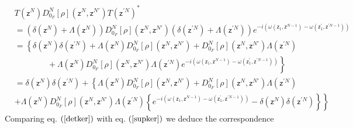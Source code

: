\documentclass[aps,preprint]{revtex4}%
\begin{document}
\begin{align}
&  T\left(  \mathsf{z}^{N}\right)  D_{0_{F}}^{N}\left[  \rho\right]  \left(
\mathsf{z}^{N},\mathsf{z}^{N\prime}\right)  T\left(  \mathsf{z}^{\prime
N}\right)  ^{\ast}\nonumber\\
&  =\left(  \delta\left(  \mathsf{z}^{N}\right)  +\Lambda\left(
\mathsf{z}^{N}\right)  \right)  D_{0_{F}}^{N}\left[  \rho\right]  \left(
\mathsf{z}^{N},\mathsf{z}^{N\prime}\right)  \left(  \delta\left(
\mathsf{z}^{\prime N}\right)  +\Lambda\left(  \mathsf{z}^{\prime N}\right)
\right)  e^{-i\left(  \omega\left(  \mathsf{z}_{1},\mathsf{z}^{N-1}\right)
-\omega\left(  \mathsf{z}_{1}^{\prime},\mathsf{z}^{\prime N-1}\right)
\right)  }\nonumber\\
&  =\left\{  \delta\left(  \mathsf{z}^{N}\right)  \delta\left(  \mathsf{z}%
^{\prime N}\right)  +\Lambda\left(  \mathsf{z}^{N}\right)  D_{0_{F}}%
^{N}\left[  \rho\right]  \left(  \mathsf{z}^{N},\mathsf{z}^{N\prime}\right)
+D_{0_{F}}^{N}\left[  \rho\right]  \left(  \mathsf{z}^{N},\mathsf{z}^{N\prime
}\right)  \Lambda\left(  \mathsf{z}^{\prime N}\right)  \right. \nonumber\\
&  \qquad\qquad+\Lambda\left(  \mathsf{z}^{N}\right)  D_{0_{F}}^{N}\left[
\rho\right]  \left(  \mathsf{z}^{N},\mathsf{z}^{N\prime}\right)
\Lambda\left(  \mathsf{z}^{\prime N}\right)  \left.  e^{-i\left(
\omega\left(  \mathsf{z}_{1},\mathsf{z}^{N-1}\right)  -\omega\left(
\mathsf{z}_{1}^{\prime},\mathsf{z}^{\prime N-1}\right)  \right)  }\right\}
\nonumber\\
&  =\delta\left(  \mathsf{z}^{N}\right)  \delta\left(  \mathsf{z}^{\prime
N}\right)  +\left\{  \Lambda\left(  \mathsf{z}^{N}\right)  D_{0_{F}}%
^{N}\left[  \rho\right]  \left(  \mathsf{z}^{N},\mathsf{z}^{N\prime}\right)
+D_{0_{F}}^{N}\left[  \rho\right]  \left(  \mathsf{z}^{N},\mathsf{z}^{N\prime
}\right)  \Lambda\left(  \mathsf{z}^{\prime N}\right)  \right. \nonumber\\
&  \left.  +\Lambda\left(  \mathsf{z}^{N}\right)  D_{0_{F}}^{N}\left[
\rho\right]  \left(  \mathsf{z}^{N},\mathsf{z}^{N\prime}\right)
\Lambda\left(  \mathsf{z}^{\prime N}\right)  \left\{  e^{-i\left(
\omega\left(  \mathsf{z}_{1},\mathsf{z}^{N-1}\right)  -\omega\left(
\mathsf{z}_{1}^{\prime},\mathsf{z}^{\prime N-1}\right)  \right)  }%
-\delta\left(  \mathsf{z}^{N}\right)  \delta\left(  \mathsf{z}^{\prime
N}\right)  \right\}  \right\}  \label{detker}%
\end{align}
Comparing eq. $\left(  \ref{detker}\right)  $ with eq. $\left(  \ref{supker}%
\right)  $ we deduce the correspondence
\end{document}
